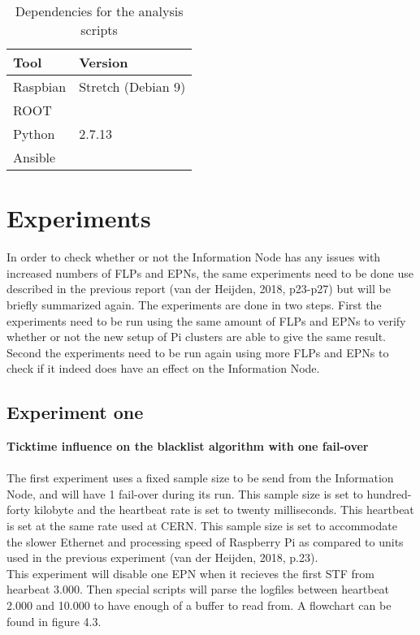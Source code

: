 \begin{table}[htb]
\begin{tabular}{| l | l |}
\hline
Tool & Version \\ \hline
Raspbian & Stretch (Debian 9) \\ \hline
ROOT & \\ \hline
Python & 2.7.13 \\ \hline
Ansible & \\ \hline
\end{tabular}
\caption{Dependencies for the analysis scripts}
\end{table}

\section{Experiments}
In order to check whether or not the Information Node has any issues with increased numbers of FLPs and EPNs, the same experiments need to be done use described in the previous report (van der Heijden, 2018, p23-p27) but will be briefly summarized again. The experiments are done in two steps. First the experiments need to be run using the same amount of FLPs and EPNs to verify whether or not the new setup of Pi clusters are able to give the same result. Second the experiments need to be run again using more FLPs and EPNs to check if it indeed does have an effect on the Information Node.

\subsection{Experiment one}
\textbf{Ticktime influence on the blacklist algorithm with one fail-over}
\\\\
The first experiment uses a fixed sample size to be send from the Information Node, and will have 1 fail-over during its run. This sample size is set to hundred-forty kilobyte and 
the heartbeat rate is set to twenty milliseconds. This heartbeat is set at the same rate used at CERN. This sample size is set to accommodate the slower Ethernet and processing speed of Raspberry Pi as compared to units used in the previous experiment (van der Heijden, 2018, p.23). \\
This experiment will disable one EPN when it recieves the first STF from hearbeat 3.000. Then special scripts will parse the logfiles between heartbeat 2.000 and 10.000 to have enough of a buffer to read from. A flowchart can be found in figure 4.3.

